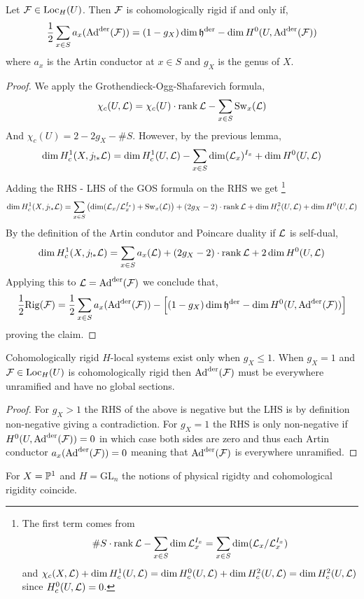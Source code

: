 \documentclass[12pt]{article}
\begin{document}
\begin{prop}
Let $\F \in \Loc_H(U)$. Then $\F$ is cohomologically rigid if and only if,
\[ \frac{1}{2} \sum_{x \in S} a_x(\Ad^{\der}(\F)) = (1 - g_X) \dim{\h^\der} - \dim H^0(U, \Ad^\der(\F)) \]
where $a_x$ is the Artin conductor at $x \in S$ and $g_X$ is the genus of $X$.
\end{prop}

\begin{proof}
We apply the Grothendieck-Ogg-Shafarevich formula,
\[ \chi_c(U, \L) = \chi_c(U) \cdot \rank{\L} - \sum_{x \in S} \Sw_x(\L) \]
And $\chi_c(U) = 2 - 2 g_X - \# S$. However, by the previous lemma,
\[ \dim{H^1_c}(X, j_{!*} \L) = \dim{H^1_c(U, \L)} - \sum_{x \in S} \dim(\L_x)^{I_x} + \dim{H^0(U, \L)} \]
Adding the RHS - LHS of the GOS formula on the RHS we get \footnote{The first term comes from \[ \# S \cdot \rank{\L} - \sum_{x \in S} \dim{\L_x^{I_x}} = \sum_{x \in S} \dim(\L_x / \L_x^{I_x}) \] and $\chi_c(X, \L) + \dim{H_c^1(U, \L)} = \dim{H^0_c(U, \L)} + \dim{H^2_c(U, \L)} = \dim{H^2_c(U, \L)}$ since $H^0_c(U, \L) = 0$.}
\[ \dim{H^1_c(X, j_{!*} \L)} = \sum_{x \in S} \left( \dim (\L_x / \L_x^{I_x}) + \Sw_x(\L) \right) + (2 g_X - 2) \cdot \rank{\L} + \dim{H^2_c(U, \L)} + \dim{H^0(U, \L)} \]
By the definition of the Artin condutor and Poincare duality if $\L$ is self-dual,
\[ \dim{H^1_c(X, j_{!*} \L)} = \sum_{x \in S} a_x(\L) + (2 g_X - 2) \cdot \rank{\L} + 2\dim{H^0(U, \L)} \]
Applying this to $\L = \Ad^\der(\F)$ we conclude that,
\[ \frac{1}{2} \Rig(\F) = \frac{1}{2} \sum_{x \in S} a_x(\Ad^{\der}(\F)) - \left[ (1 - g_X) \dim{\h^\der} - \dim H^0(U, \Ad^\der(\F)) \right] \]
proving the claim.
\end{proof}

\begin{cor}
Cohomologically rigid $H$-local systems exist only when $g_X \le 1$. When $g_X = 1$ and $\F \in \Loc_H(U)$ is cohomologically rigid then $\Ad^\der(\F)$ must be everywhere unramified and have no global sections.
\end{cor}

\begin{proof}
For $g_X > 1$ the RHS of the above is negative but the LHS is by definition non-negative giving a contradiction. For $g_X = 1$ the RHS is only non-negative if $H^0(U, \Ad^\der(\F)) = 0$ in which case both sides are zero and thus each Artin conductor $a_x(\Ad^{\der}(\F)) = 0$ meaning that $\Ad^{\der}(\F)$ is everywhere unramified. 
\end{proof}

\begin{thm}[Katz]
For $X = \P^1$ and $H = \mathrm{GL}_n$ the notions of physical rigidty and cohomological rigidity coincide. 
\end{thm}
\end{document}
